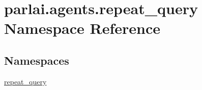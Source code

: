 \hypertarget{namespaceparlai_1_1agents_1_1repeat__query}{}\section{parlai.\+agents.\+repeat\+\_\+query Namespace Reference}
\label{namespaceparlai_1_1agents_1_1repeat__query}
\subsection*{Namespaces}
\begin{DoxyCompactItemize}
\item 
 \hyperlink{namespaceparlai_1_1agents_1_1repeat__query_1_1repeat__query}{repeat\+\_\+query}
\end{DoxyCompactItemize}
